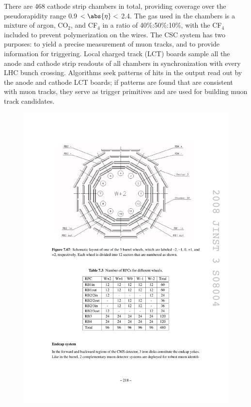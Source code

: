 There are 468 cathode strip chambers in total, providing coverage over the pseudorapidity range 0.9 $< \abs{\eta} <$ 2.4. The gas used in the chambers is a mixture of argon, CO$_2$, and CF$_4$ in a ratio of 40\%:50\%:10\%, with the CF$_4$ included to prevent polymerization on the wires. The CSC system has two purposes: to yield a precise measurement of muon tracks, and to provide information for triggering. Local charged track (LCT) boards sample all the anode and cathode strip readouts of all chambers in synchronization with every LHC bunch crossing. Algorithms seek patterns of hits in the output read out by the anode and cathode LCT boards; if patterns are found that are consistent with muon tracks, they serve as trigger primitives and are used for building muon track candidates.

\begin{figure}[hbtp]
  \begin{center}
    \includegraphics[width=1.24\cmsFigWidth]{figures/cms-muon-RPCbarrellayout}

\end{center}
\end{figure}

